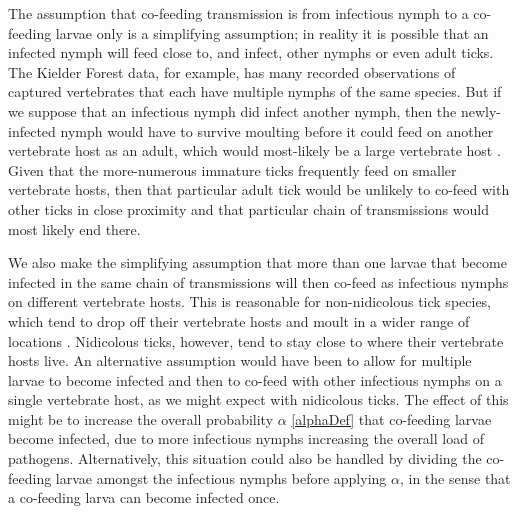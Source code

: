 \documentclass{article}
\begin{document}
The assumption that co-feeding transmission is from infectious nymph to a co-feeding larvae only is a simplifying assumption; in reality it is possible that an infected nymph will feed close to, and infect, other nymphs or even adult ticks. The Kielder Forest data, for example, has many recorded observations of captured vertebrates that each have multiple nymphs of the same species. But if we suppose that an infectious nymph did infect another nymph, then the newly-infected nymph would have to survive moulting before it could feed on another vertebrate host as an adult, which would most-likely be a large vertebrate host \cite{Randolph1998}. Given that the more-numerous immature ticks frequently feed on smaller vertebrate hosts, then that particular adult tick would be unlikely to co-feed with other ticks in close proximity and that particular chain of transmissions would most likely end there.

We also make the simplifying assumption that more than one larvae that become infected in the same chain of transmissions will then co-feed as infectious nymphs on different vertebrate hosts. This is reasonable for non-nidicolous tick species, which tend to drop off their vertebrate hosts and moult in a wider range of locations \cite{Nicholson2019}. Nidicolous ticks, however, tend to stay close to where their vertebrate hosts live. An alternative assumption would have been to allow for multiple larvae to become infected and then to co-feed with other infectious nymphs on a single vertebrate host, as we might expect with nidicolous ticks. The effect of this might be to increase the overall probability $ \alpha $ \eqref{alphaDef} that co-feeding larvae become infected, due to more infectious nymphs increasing the overall load of pathogens. Alternatively, this situation could also be handled by dividing the co-feeding larvae amongst the infectious nymphs before applying $ \alpha $, in the sense that a co-feeding larva can become infected once.
\end{document}

